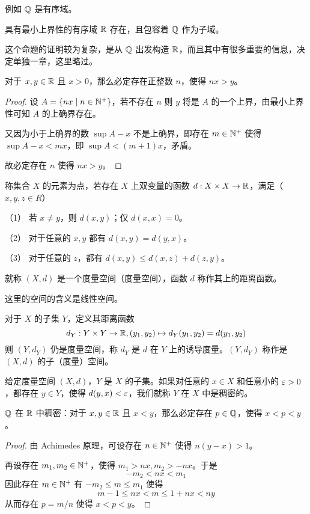 例如 $\mathbb{Q}$ 是有序域。

\begin{theorem}[存在定理]
	具有最小上界性的有序域 $\mathbb{R}$ 存在，且包容着 $\mathbb{Q}$ 作为子域。
\end{theorem}

这个命题的证明较为复杂，是从 $\mathbb{Q}$ 出发构造 $\mathbb{R}$，而且其中有很多重要的信息，决定单独一章，这里略过。

\begin{theorem}[Achimedes 原理]
	对于 $x,y \in \mathbb{R}$ 且 $x>0$，那么必定存在正整数 $n$，使得 $nx>y$。
\end{theorem}
\begin{proof}
	设 $A = \{nx \mid n \in \mathbb{N}^+ \}$，若不存在 $n$ 则 $y$ 将是 $A$ 的一个上界，由最小上界性可知 $A$ 的上确界存在。
	
	又因为小于上确界的数 $\sup A-x$ 不是上确界，即存在 $m\in \mathbb{N}^+$ 使得 $\sup A -x <mx$，即 $\sup A < (m+1)x$，矛盾。

	故必定存在 $n$ 使得 $nx>y$。
\end{proof}

\begin{definition}[度量空间]
	称集合 $X$ 的元素为点，若存在 $X$ 上双变量的函数 $d:X \times X \to \mathbb{R}$，满足（$x,y,z\in R$）

	（1） 若 $x\ne y$，则 $d(x,y)$；仅 $d(x,x)=0$。

	（2） 对于任意的 $x,y$ 都有 $d(x,y) = d(y,x)$。

	（3） 对于任意的 $z$，都有 $d(x,y) \leqslant d(x,z) + d(z,y)$。

	就称 $(X,d)$ 是一个度量空间（度量空间），函数 $d$ 称作其上的距离函数。
\end{definition}

这里的空间的含义是线性空间。

对于 $X$ 的子集 $Y$，定义其距离函数
$$d_Y: Y \times Y \to \mathbb{R}, (y_1,y_2) \mapsto d_Y(y_1,y_2)=d(y_1,y_2)$$
则 $(Y,d_Y)$ 仍是度量空间，称 $d_Y$ 是 $d$ 在 $Y$ 上的诱导度量。$(Y,d_Y)$ 称作是 $(X,d)$ 的子（度量）空间。

\begin{definition}[稠密性]
	给定度量空间 $(X,d)$，$Y$ 是 $X$ 的子集。如果对任意的 $x\in X$ 和任意小的 $\varepsilon>0$，都存在 $y\in Y$，使得 $d(y,x)<\varepsilon$，我们就称 $Y$ 在 $X$ 中是稠密的。
\end{definition}

\begin{example}
	$\mathbb{Q}$ 在 $\mathbb{R}$ 中稠密：对于 $x,y \in \mathbb{R}$ 且 $x<y$，那么必定存在 $p\in\mathbb{Q}$，使得 $x<p<y$。
\end{example}
\begin{proof}
	由 Achimedes 原理，可设存在 $n\in \mathbb{N}^+$ 使得 $n(y-x)>1$。
	
	再设存在 $m_1,m_2\in \mathbb{N}^+$，使得 $m_1>nx,m_2>-nx$。于是
	$$-m_2<nx<m_1$$
	因此存在 $m\in \mathbb{N}^+$ 有 $-m_2\leqslant m \leqslant m_1$ 使得
	$$m-1\leqslant nx < m \leqslant 1+nx < ny$$
	从而存在 $p=m/n$ 使得 $x<p<y$。
\end{proof}


